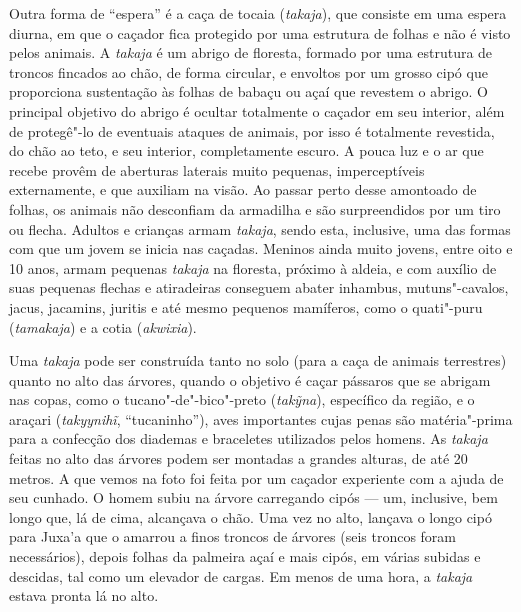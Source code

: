Outra forma de ``espera'' é a caça de tocaia (\emph{takaja}), que consiste
em uma espera diurna, em que o caçador fica protegido por uma estrutura
de folhas e não é visto pelos animais. A \emph{takaja} é um abrigo de
floresta, formado por uma estrutura de troncos fincados ao chão, de
forma circular, e envoltos por um grosso cipó que proporciona
sustentação às folhas de babaçu ou açaí que revestem o abrigo. O
principal objetivo do abrigo é ocultar totalmente o caçador em seu
interior, além de protegê"-lo de eventuais ataques de animais, por isso é
totalmente revestida, do chão ao teto, e seu interior, completamente
escuro. A pouca luz e o ar que recebe provêm de aberturas laterais muito
pequenas, imperceptíveis externamente, e que auxiliam na visão. Ao
passar perto desse amontoado de folhas, os animais não desconfiam da
armadilha e são surpreendidos por um tiro ou flecha. Adultos e crianças
armam \emph{takaja}, sendo esta, inclusive, uma das formas com que um
jovem se inicia nas caçadas. Meninos ainda muito jovens, entre oito e 10
anos, armam pequenas \emph{takaja} na floresta, próximo à aldeia, e com
auxílio de suas pequenas flechas e atiradeiras conseguem abater
inhambus, mutuns"-cavalos, jacus, jacamins, juritis e até mesmo pequenos
mamíferos, como o quati"-puru (\emph{tamakaja}) e a cotia
(\emph{akwixia}).

Uma \emph{takaja} pode ser construída tanto no solo (para a caça de
animais terrestres) quanto no alto das árvores, quando o objetivo é
caçar pássaros que se abrigam nas copas, como o tucano"-de"-bico"-preto
(\emph{takỹna}), específico da região, e o araçari (\emph{takyynihĩ},
``tucaninho''), aves importantes cujas penas são matéria"-prima para a
confecção dos diademas e braceletes utilizados pelos homens. As
\emph{takaja} feitas no alto das árvores podem ser montadas a grandes
alturas, de até 20 metros. A que vemos na foto foi feita por um caçador
experiente com a ajuda de seu cunhado. O homem subiu na árvore
carregando cipós --- um, inclusive, bem longo que, lá de cima, alcançava o
chão. Uma vez no alto, lançava o longo cipó para Juxa'a que o amarrou a
finos troncos de árvores (seis troncos foram necessários), depois folhas
da palmeira açaí e mais cipós, em várias subidas e descidas, tal como um
elevador de cargas. Em menos de uma hora, a \emph{takaja} estava pronta
lá no alto.


